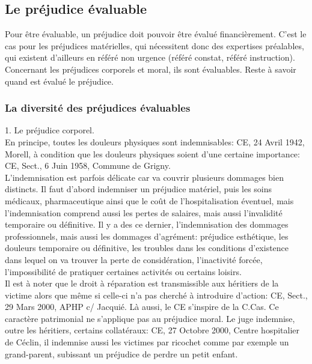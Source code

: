 \documentclass[10pt, a4paper, openany]{book}
\begin{document}
\subsection{Le préjudice évaluable}

Pour être évaluable, un préjudice doit pouvoir être évalué financièrement. C'est le cas pour les préjudices matérielles, qui nécessitent donc des expertises préalables, qui existent d'ailleurs en référé non urgence (référé constat, référé instruction). \\
Concernant les préjudices corporels et moral, ils sont évaluables. Reste à savoir quand est évalué le préjudice.

\subsubsection{La diversité des préjudices évaluables}


1. Le préjudice corporel. \\
En principe, toutes les douleurs physiques sont indemnisables: CE, 24 Avril 1942, Morell, à condition que les douleurs physiques soient d'une certaine importance: CE, Sect., 6 Juin 1958, Commune de Grigny. \\
L'indemnisation est parfois délicate car va couvrir plusieurs dommages bien distincts. Il faut d'abord indemniser un préjudice matériel, puis les soins médicaux, pharmaceutique ainsi que le coût de l'hospitalisation éventuel, mais l'indemnisation comprend aussi les pertes de salaires, mais aussi l'invalidité temporaire ou définitive. Il y a des ce dernier, l'indemnisation des dommages professionnels, mais aussi les dommages d'agrément: préjudice esthétique, les douleurs temporaire ou définitive, les troubles dans les conditions d'existence dans lequel on va trouver la perte de considération, l'inactivité forcée, l'impossibilité de pratiquer certaines activités ou certains loisirs. \\
Il est à noter que le droit à réparation est transmissible aux héritiers de la victime alors que même si celle-ci n'a pas cherché à introduire d'action: CE, Sect., 29 Mars 2000, APHP c/ Jacquié. Là aussi, le CE s'inspire de la C.Cas. Ce caractère patrimonial ne s'applique pas au préjudice moral. Le juge indemnise, outre les héritiers, certains collatéraux: CE, 27 Octobre 2000, Centre hospitalier de Céclin, il indemnise aussi les victimes par ricochet comme par exemple un grand-parent, subissant un préjudice de perdre un petit enfant. 
\end{document}

